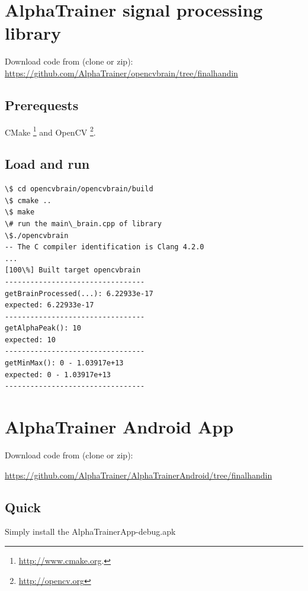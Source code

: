 \documentclass[a4paper,10pt,english,lof,lot,twoside]{puthesis}
\begin{document}
\section{AlphaTrainer signal processing library}
\label{appendix_software:appendix-alphatrainer-signal-processing-library}\label{appendix_software:alphatrainer-signal-processing-library}
Download code from (clone or zip): \href{https://github.com/AlphaTrainer/opencvbrain/tree/finalhandin}{https://github.com/AlphaTrainer/opencvbrain/tree/finalhandin}


\subsection{Prerequests}
\label{appendix_software:prerequests}
CMake \footnote{
\href{http://www.cmake.org}{http://www.cmake.org}.
} and OpenCV \footnote{
\href{http://opencv.org}{http://opencv.org}
}.


\subsection{Load and run}
\label{appendix_software:load-and-run}
\begin{Verbatim}[commandchars=\\\{\}]
\$ cd opencvbrain/opencvbrain/build
\$ cmake ..
\$ make
\# run the main\_brain.cpp of library
\$./opencvbrain
-- The C compiler identification is Clang 4.2.0
...
[100\%] Built target opencvbrain
---------------------------------
getBrainProcessed(...): 6.22933e-17
expected: 6.22933e-17
---------------------------------
getAlphaPeak(): 10
expected: 10
---------------------------------
getMinMax(): 0 - 1.03917e+13
expected: 0 - 1.03917e+13
---------------------------------
\end{Verbatim}


\section{AlphaTrainer Android App}
\label{appendix_software:alphatrainer-android-app}\label{appendix_software:appendix-alphatrainer-android-app}
Download code from (clone or zip):

\href{https://github.com/AlphaTrainer/AlphaTrainerAndroid/tree/finalhandin}{https://github.com/AlphaTrainer/AlphaTrainerAndroid/tree/finalhandin}


\subsection{Quick}
\label{appendix_software:quick}
Simply install the AlphaTrainerApp-debug.apk
\end{document}
